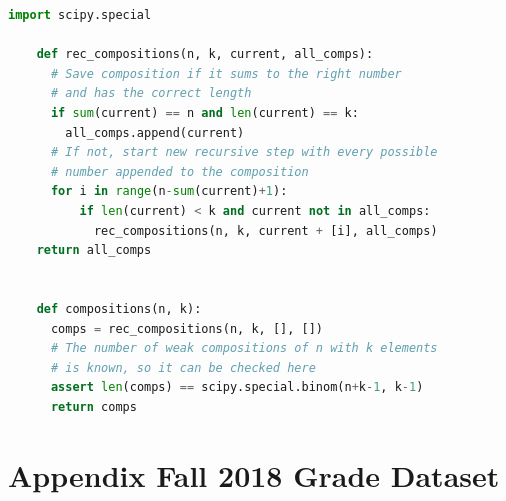\documentclass[12pt,letterpaper,oneside,openany]{book}
\renewcommand{\bibname}{\begin{center}{\bf \sc \Large Bibliography}\end{center}}
\begin{document}
\begin{minipage}{\linewidth}
	\begin{lstlisting}[language=Python, caption={Python code to compute the distance matrix of  a set of grade distributions, given as a pandas Series object.}, label={lst:pycomps}, captionpos=b]
	import scipy.special
	
	def rec_compositions(n, k, current, all_comps):
	  # Save composition if it sums to the right number
	  # and has the correct length
	  if sum(current) == n and len(current) == k:
	    all_comps.append(current)
	  # If not, start new recursive step with every possible 
	  # number appended to the composition
	  for i in range(n-sum(current)+1):
		  if len(current) < k and current not in all_comps:
		    rec_compositions(n, k, current + [i], all_comps)
    return all_comps


    def compositions(n, k):
      comps = rec_compositions(n, k, [], [])
      # The number of weak compositions of n with k elements
      # is known, so it can be checked here
      assert len(comps) == scipy.special.binom(n+k-1, k-1)
      return comps
	\end{lstlisting}
\end{minipage}


%

\singlespace





\clearpage
\appendix
\setcounter{chapter}{5}
\setcounter{table}{0}
\chapter{Appendix Fall 2018 Grade Dataset}
\label{ch:appendix}
\end{document}
